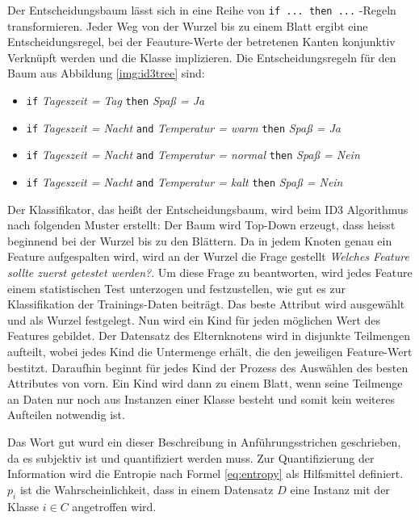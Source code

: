 Der Entscheidungsbaum lässt sich in eine Reihe von \texttt{if ... then ...}
-Regeln transformieren. Jeder Weg von der Wurzel bis zu einem Blatt ergibt eine Entscheidungsregel, bei der Feauture-Werte der betretenen Kanten konjunktiv Verknüpft werden und die Klasse implizieren. Die Entscheidungsregeln für den Baum aus Abbildung 	\ref{img:id3tree} sind: \cite[S. 134]{machine_marsland}

\begin{itemize}
	\item \texttt{if}  \emph{Tageszeit = Tag} \texttt{then} \emph{Spaß = Ja}
	\item \texttt{if}  \emph{Tageszeit = Nacht} \texttt{and} \emph{Temperatur = warm} \texttt{then} \emph{Spaß = Ja}
	\item \texttt{if}  \emph{Tageszeit = Nacht} \texttt{and} \emph{Temperatur = normal} \texttt{then} \emph{Spaß = Nein}
	\item \texttt{if}  \emph{Tageszeit = Nacht} \texttt{and} \emph{Temperatur = kalt} \texttt{then} \emph{Spaß = Nein}
\end{itemize}

Der Klassifikator, das heißt der Entscheidungsbaum,  wird beim ID3 Algorithmus nach folgenden Muster erstellt:
Der Baum wird Top-Down erzeugt, dass heisst beginnend bei der Wurzel bis zu den Blättern. Da in jedem Knoten genau ein Feature  aufgespalten wird, wird an der Wurzel die Frage gestellt \glqq \emph{Welches Feature sollte zuerst getestet werden?}\grqq . Um diese Frage zu beantworten, wird jedes Feature einem statistischen Test unterzogen und festzustellen, wie \glqq gut\grqq{} es zur Klassifikation der Trainings-Daten beiträgt. Das \glqq beste\grqq{} Attribut wird ausgewählt und als Wurzel festgelegt. Nun wird ein Kind für jeden möglichen Wert des Features gebildet. Der Datensatz des Elternknotens wird in disjunkte Teilmengen aufteilt, wobei jedes Kind die Untermenge erhält, die den jeweiligen Feature-Wert bestitzt. Daraufhin beginnt für jedes Kind der Prozess des Auswählen des \glqq besten\grqq{} Attributes von vorn. Ein Kind wird dann zu einem Blatt, wenn seine Teilmenge an Daten nur noch aus Instanzen einer Klasse besteht und somit kein weiteres Aufteilen notwendig ist.\cite[S. 55]{machine_mitchell}

Das Wort \glqq gut\grqq{} wurd ein dieser Beschreibung in Anführungsstrichen geschrieben, da es subjektiv ist und quantifiziert werden muss. Zur Quantifizierung der Information wird die Entropie nach Formel \ref{eq:entropy} als Hilfsmittel definiert. $p_i$ ist die Wahrscheinlichkeit, dass in einem Datensatz $D$ eine Instanz mit der Klasse $i \in C$ angetroffen wird.

